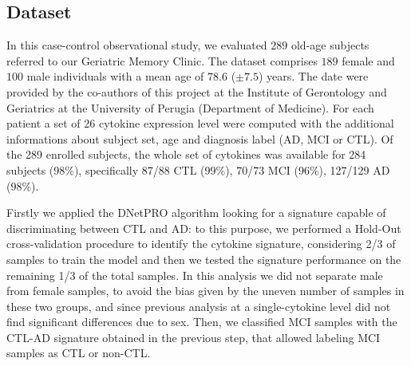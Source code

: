 \documentclass{standalone}
\begin{document}
\subsection[Dataset]{Dataset}\label{cytokine_data}

In this case-control observational study, we evaluated $289$ old-age subjects referred to our Geriatric Memory Clinic.
The dataset comprises $189$ female and $100$ male individuals with a mean age of $78.6$ ($\pm7.5$) years.
The date were provided by the co-authors of this project at the Institute of Gerontology and Geriatrics at the University of Perugia (Department of Medicine).
For each patient a set of 26 cytokine expression level were computed with the additional informations about subject set, age and diagnosis label (AD, MCI or CTL).
Of the 289 enrolled subjects, the whole set of cytokines was available for 284 subjects (98\%), specifically 87/88 CTL (99\%), 70/73 MCI (96\%), 127/129 AD (98\%).

Firstly we applied the DNetPRO algorithm looking for a signature capable of discriminating between CTL and AD: to this purpose, we performed a Hold-Out cross-validation procedure to identify the cytokine signature, considering 2/3 of samples to train the model and then we tested the signature performance on the remaining 1/3 of the total samples.
In this analysis we did not separate male from female samples, to avoid the bias given by the uneven number of samples in these two groups, and since previous analysis at a single-cytokine level did not find significant differences due to sex.
Then, we classified MCI samples with the CTL-AD signature obtained in the previous step,  that allowed labeling MCI samples as CTL or non-CTL.


\end{document}
